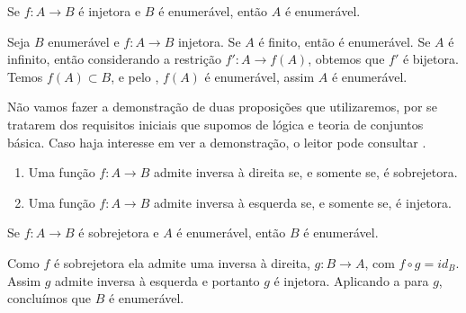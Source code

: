 \documentclass[../main.tex]{subfiles}
\begin{document}
    

\begin{prop}\label{enum-prop-ABFinjetoraBenumeravelAenumeravel}
    Se $f \colon A \to B$ é injetora e $B$ é enumerável, então $A$ é enumerável.
\end{prop}
\begin{dem}
    Seja $B$ enumerável e $f \colon A \to B$ injetora.
    Se $A$ é finito, então é enumerável. Se $A$ é infinito, então considerando a restrição $f' \colon A \to f(A)$, obtemos que $f'$ é bijetora.
    Temos $f(A) \subset B$, e pelo , $f(A)$ é enumerável, assim $A$ é enumerável.
\end{dem}

\begin{obs}
    Não vamos fazer a demonstração de duas proposições que utilizaremos, por se tratarem dos requisitos iniciais que supomos de lógica e teoria de conjuntos básica. Caso haja interesse em ver a demonstração, o leitor pode consultar \textcite[p. 22]{lima-analise-1}.
    \begin{enumerate}[label=(\roman*)]
        \item Uma função $f \colon A \to B$ admite inversa à direita se, e somente se, é sobrejetora.
        \item Uma função $f \colon A \to B$ admite inversa à esquerda se, e somente se, é injetora.
    \end{enumerate}
\end{obs}

\begin{prop}\label{enum-prop-ABFsobrejetoraAenumeravelBenumeravel}
    Se $f \colon A \to B$ é sobrejetora e $A$ é enumerável, então $B$ é enumerável.
\end{prop}
\begin{dem}
    Como $f$ é sobrejetora ela admite uma inversa à direita, $g \colon B \to A$, com $f \circ g = id_B$. Assim $g$ admite inversa à esquerda e portanto $g$ é injetora. Aplicando a  para $g$, concluímos que $B$ é enumerável. 
\end{dem}

\end{document}
